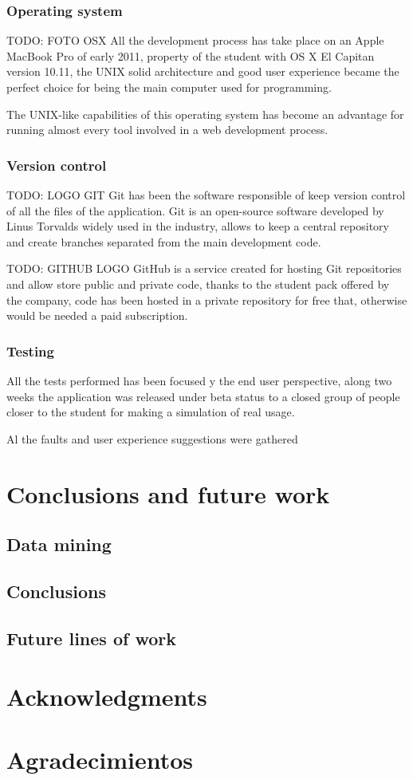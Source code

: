 \documentclass{DeustoFDP}
\begin{document}
\subsection{Operating system}
TODO: FOTO OSX
All the development process has take place on an Apple MacBook Pro of early 2011, property of the student with OS X El Capitan version 10.11, the UNIX solid architecture and good user experience became the perfect choice for being the main computer used for programming.

The UNIX-like capabilities of this operating system has become an advantage for running almost every tool involved in a web development process.
\subsection{Version control}
TODO: LOGO GIT
Git has been the software responsible of keep version control of all the files of the application. Git is an open-source software developed by Linus Torvalds widely used in the industry, allows to keep a central repository and create branches separated from the main development code.

TODO: GITHUB LOGO
GitHub is a service created for hosting Git repositories and allow store public and private code, thanks to the student pack offered by the company, code has been hosted in a private repository for free that, otherwise would be needed a paid subscription.
\subsection{Testing}
All the tests performed has been focused y the end user perspective, along two weeks the application was released under beta status to a closed group of people closer to the student for making a simulation of real usage.

Al the faults and user experience suggestions were gathered 
\chapter{Conclusions and future work}
\section{Data mining}
\section{Conclusions}
\section{Future lines of work}

\chapter{Acknowledgments}

\chapter{Agradecimientos}

\printbibliography[heading=bibintoc]

\appendix

\backmatter
\end{document}
